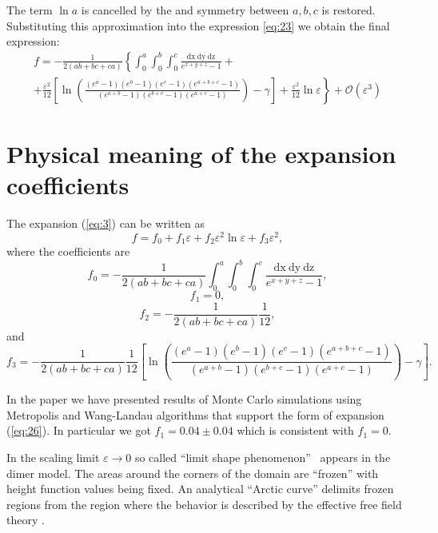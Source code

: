 \documentclass{article}
\newcommand{\dx}{\mathrm{dx}~}
\newcommand{\dy}{\mathrm{dy}~}
\newcommand{\dz}{\mathrm{dz}}
\begin{document}
  

The term $\ln a$ is cancelled by the  and symmetry between $a,b,c$ is restored.
Substituting this approximation into the expression \eqref{eq:23} we obtain 
 the final expression:
\begin{multline}
  \label{eq:3}
 f=-\frac{1}{2(ab+bc+ca)}\left\{\int_{0}^{a} \int_{0}^{b}\int_{0}^{c}\frac{\dx \dy \dz}{e^{x+y+z}-1}+\right.\\
  \left.+\frac{\varepsilon^{2}}{12}\left[\ln\left(\frac{(e^{a}-1)(e^{b}-1)(e^{c}-1)(e^{a+b+c}-1)}{(e^{a+b}-1)(e^{b+c}-1)(e^{a+c}-1)}\right)-
      \gamma\right]+\frac{\varepsilon^{2}}{12}\ln \varepsilon\right\} +\mathcal{O}(\varepsilon^{3})
\end{multline}

\section{Physical meaning of the expansion coefficients}
\label{sec:accur-expans-phys}

The expansion  (\ref{eq:3}) can be written as
\begin{equation}
  \label{eq:26}
  f=f_{0}+f_{1}\varepsilon +f_{2}\varepsilon^{2}\ln\varepsilon+ f_{3}\varepsilon^{2},
\end{equation}
where the coefficients are
\begin{equation}
  \label{eq:27}
  f_{0}=-\frac{1}{2(ab+bc+ca)}\int_{0}^{a} \int_{0}^{b}\int_{0}^{c}\frac{\dx \dy \dz}{e^{x+y+z}-1},
\end{equation}
\begin{equation}
  \label{eq:28}
  f_{1}=0,
\end{equation}
\begin{equation}
  \label{eq:30}
  f_{2}=-\frac{1}{2(ab+bc+ca)}\frac{1}{12},
\end{equation}
and
\begin{equation}
  \label{eq:29}
  f_{3}=-\frac{1}{2(ab+bc+ca)}\frac{1}{12}\left[\ln\left(\frac{(e^{a}-1)(e^{b}-1)(e^{c}-1)(e^{a+b+c}-1)}{(e^{a+b}-1)(e^{b+c}-1)(e^{a+c}-1)}\right)-
    \gamma\right].
\end{equation}

In the paper \cite{1742-6596-1135-1-012024} we have presented results of Monte Carlo simulations using
Metropolis and Wang-Landau algorithms that support the form of expansion (\ref{eq:26}). In
particular we got $f_{1}=0.04\pm 0.04$ which is consistent with $f_{1}=0$. 

In the scaling limit $\varepsilon\to 0$ so called ``limit shape phenomenon''~\cite{1998math......1068J,cohn1998shape}
appears in the dimer model. The areas around the corners of the domain are ``frozen'' with height
function values being fixed. An analytical ``Arctic curve'' delimits frozen regions from the region
where the behavior is described by the effective free field theory
\cite{kenyon2009lectures,kenyon2008height,kenyon2006dimers}.
\end{document}
